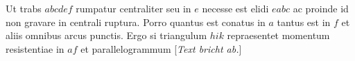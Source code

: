 Ut trabs\protect{} $abcdef$ rumpatur centraliter seu in $e$
necesse est elidi $eabc$ ac proinde id non gravare in centrali ruptura.\protect{}
Porro quantus est conatus in $a$ tantus est in $f$ et aliis omnibus arcus punctis.
Ergo si triangulum $hik$ repraesentet momentum resistentiae\protect{} in $af$
et parallelogrammum [\textit{Text bricht ab.}]
\pend
\count{}
\count{}
\count{}